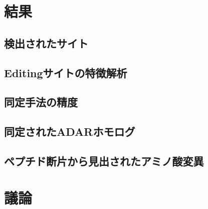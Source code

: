 \section{結果}
\subsection{検出されたサイト}
\subsection{Editingサイトの特徴解析}
\subsection{同定手法の精度}
\subsection{同定されたADARホモログ}
\subsection{ペプチド断片から見出されたアミノ酸変異}

\section{議論}
